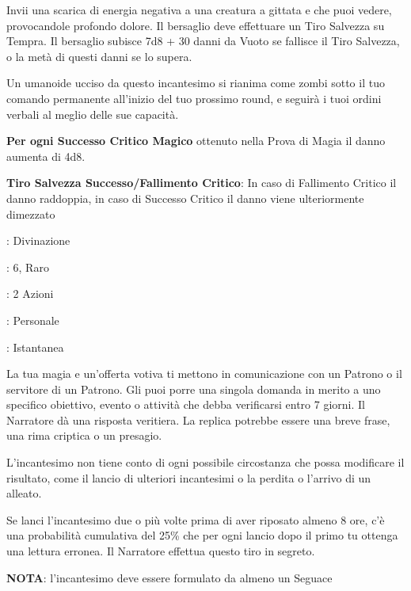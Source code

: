 \begin{multicols}{2}
Invii una scarica di energia negativa a una creatura a gittata e che puoi vedere, provocandole profondo dolore. Il bersaglio deve effettuare un Tiro Salvezza su Tempra. Il bersaglio subisce 7d8 + 30 danni da Vuoto se fallisce il Tiro Salvezza, o la metà di questi danni se lo supera.

Un umanoide ucciso da questo incantesimo si rianima come zombi sotto il tuo comando permanente all'inizio del tuo prossimo round, e seguirà i tuoi ordini verbali al meglio delle sue capacità.

\textbf{Per ogni Successo Critico Magico} ottenuto nella Prova di Magia il danno aumenta di 4d8.

\textbf{Tiro Salvezza Successo/Fallimento Critico}: In caso di Fallimento Critico il danno raddoppia, in caso di Successo Critico il danno viene ulteriormente dimezzato

\noindent\colorbox{OBSSgold!10}{
\begin{minipage}{0.95\linewidth}
\begin{description}[noitemsep, topsep=0pt, parsep=0pt, partopsep=0pt, leftmargin=0cm, labelwidth=1.3cm]
	\item[\textbf{Lista}]: Divinazione
	\item[\textbf{Livello}]: 6, Raro
	\item[\textbf{Lancio}]: 2 Azioni
	\item[\textbf{Gittata}]: Personale
	\item[\textbf{Durata}]: Istantanea
\end{description}
\end{minipage}}\smallskip

La tua magia e un'offerta votiva ti mettono in comunicazione con un Patrono o il servitore di un Patrono. Gli puoi porre una singola domanda in merito a uno specifico obiettivo, evento o attività che debba verificarsi entro 7 giorni. Il Narratore dà una risposta veritiera. La replica potrebbe essere una breve frase, una rima criptica o un presagio.

L'incantesimo non tiene conto di ogni possibile circostanza che possa modificare il risultato, come il lancio di ulteriori incantesimi o la perdita o l'arrivo di un alleato.

Se lanci l'incantesimo due o più volte prima di aver riposato almeno 8 ore, c'è una probabilità cumulativa del 25\% che per ogni lancio dopo il primo tu ottenga una lettura erronea. Il Narratore effettua questo tiro in segreto.

\textbf{NOTA}: l'incantesimo deve essere formulato da almeno un Seguace


\end{multicols}
